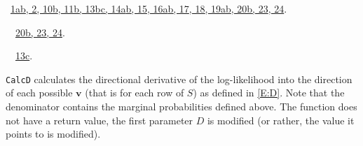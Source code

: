 \documentclass[reqno]{amsart}
\renewcommand{\NWlink}[2]{\hyperlink{#1}{#2}}
\newcommand{\bv}{\mathbf{v}}
\begin{document}
\begin{flushleft}
\begin{list}{}{}
\mbox{}\verb@@{\NWsep}
\end{list}
\vspace{-1.5ex}
\footnotesize
\begin{list}{}{\setlength{\itemsep}{-\parsep}\setlength{\itemindent}{-\leftmargin}}
\item \NWtxtFileDefBy\ \NWlink{nuweb1a}{1a}\NWlink{nuweb1b}{b}\NWlink{nuweb2}{, 2}\NWlink{nuweb10b}{, 10b}\NWlink{nuweb11b}{, 11b}\NWlink{nuweb13b}{, 13b}\NWlink{nuweb13c}{c}\NWlink{nuweb14a}{, 14a}\NWlink{nuweb14b}{b}\NWlink{nuweb15}{, 15}\NWlink{nuweb16a}{, 16a}\NWlink{nuweb16b}{b}\NWlink{nuweb17}{, 17}\NWlink{nuweb18}{, 18}\NWlink{nuweb19a}{, 19a}\NWlink{nuweb19b}{b}\NWlink{nuweb20b}{, 20b}\NWlink{nuweb23}{, 23}\NWlink{nuweb24}{, 24}.
\item \NWtxtIdentsDefed\nobreak\  \verb@CalcMarginals@\nobreak\ \NWlink{nuweb20b}{20b}\NWlink{nuweb23}{, 23}\NWlink{nuweb24}{, 24}.\item \NWtxtIdentsUsed\nobreak\  \verb@HyperTable@\nobreak\ \NWlink{nuweb13c}{13c}.
\item{}
\end{list}
\vspace{4ex}
\end{flushleft}
\texttt{CalcD} calculates the directional derivative of the log-likelihood into
the direction of each possible $\bv$ (that is for each row of $S$) as defined
in \eqref{E:D}. Note that the denominator contains the marginal probabilities 
defined above. The function does not have a return value, the first parameter 
$D$ is modified (or rather, the value it points to is modified).
\end{document}
